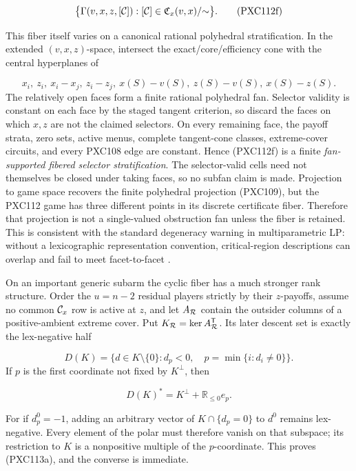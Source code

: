 \documentclass[11pt]{article}
\begin{document}
\[
 \bigl\{\Gamma(v,x,z,[{\cal C}]):
          [{\cal C}]\in\mathfrak C_x(v,x)/{\sim}\bigr\}.     \tag{PXC112f}
\]

This fiber itself varies on a canonical rational polyhedral stratification.
In the extended \((v,x,z)\)-space, intersect the exact/core/efficiency cone
with the central hyperplanes of

\[
 x_i,\ z_i,\ x_i-x_j,\ z_i-z_j,\ x(S)-v(S),\ z(S)-v(S),
 \ x(S)-z(S).
\]
The relatively open faces form a finite rational polyhedral fan.  Selector
validity is constant on each face by the staged tangent criterion, so discard
the faces on which \(x,z\) are not the claimed selectors.  On every remaining
face, the payoff strata, zero sets, active menus, complete tangent-cone
classes, extreme-cover circuits, and every PXC108 edge are constant.  Hence
(PXC112f) is a finite \emph{fan-supported fibered selector stratification}.
The selector-valid cells need not themselves be closed under taking faces,
so no subfan claim is made.  Projection to game space
recovers the finite polyhedral projection (PXC109), but the PXC112 game has
three different points in its discrete certificate fiber.  Therefore that
projection is not a single-valued obstruction fan unless the fiber is
retained.  This is consistent with the standard degeneracy warning in
multiparametric LP: without a lexicographic representation convention,
critical-region descriptions can overlap and fail to meet facet-to-facet
\citep{JonesKerriganMaciejowski2007}.

On an important generic subarm the cyclic fiber has a much stronger
rank structure.  Order the \(u=n-2\) residual players strictly by
their \(z\)-payoffs, assume no common \({\cal C}_x\) row is active at \(z\),
and let \(A_{\cal R}\) contain the outsider columns of a positive-ambient
extreme cover.  Put \(K_{\cal R}=\ker A_{\cal R}^{\mathsf T}\).  Its later
descent set is exactly the lex-negative half

\[
 D(K)=\{d\in K\setminus\{0\}:d_p<0,\quad
        p=\min\{i:d_i\ne0\}\}.
\]
If \(p\) is the first coordinate not fixed by \(K^\perp\), then

\begin{equation}
 D(K)^*=K^\perp+\mathbb R_{\le0}e_p.                       \tag{PXC113a}
\end{equation}

For if \(d^0_p=-1\), adding an arbitrary vector of
\(K\cap\{d_p=0\}\) to \(d^0\) remains lex-negative.  Every element of the
polar must therefore vanish on that subspace; its restriction to \(K\) is a
nonpositive multiple of the \(p\)-coordinate.  This proves (PXC113a), and
the converse is immediate.
\end{document}
